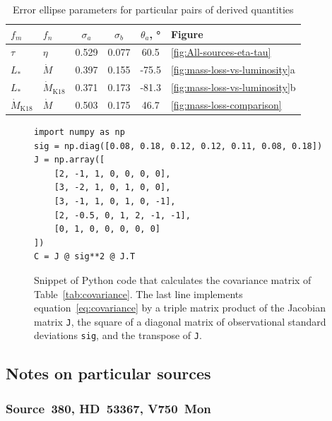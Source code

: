 \begin{table}
  \centering
  \caption[Error ellipse]{Error ellipse parameters for particular pairs of derived quantities}
  \label{tab:error-ellipse}
  \begin{tabular}{l l S S S l}
    \toprule
    \(f_m\) & \(f_n\) &  {\(\sigma_a\)} & {\(\sigma_b\)}
    & {\(\theta_a\), \si{\degree}} & Figure   \\
    \midrule
    \(\tau\) & \(\eta\) & 0.529 & 0.077 & 60.5 & \ref{fig:All-sources-eta-tau} \\
    \(L_*\) & \(\dot M\) & 0.397 & 0.155 & -75.5 & \ref{fig:mass-loss-vs-luminosity}a \\
    \(L_*\) & \(\dot M_{\text{K18}}\) & 0.371 & 0.173 & -81.3 & \ref{fig:mass-loss-vs-luminosity}b \\
    \(\dot M_{\text{K18}}\) & \(\dot M\) & 0.503 & 0.175 & 46.7 & \ref{fig:mass-loss-comparison} \\
    \bottomrule
  \end{tabular}
\end{table}


\begin{figure}
  \centering
  \footnotesize
  \begin{verbatim}
import numpy as np
sig = np.diag([0.08, 0.18, 0.12, 0.12, 0.11, 0.08, 0.18])
J = np.array([
    [2, -1, 1, 0, 0, 0, 0],
    [3, -2, 1, 0, 1, 0, 0],
    [3, -1, 1, 0, 1, 0, -1],
    [2, -0.5, 0, 1, 2, -1, -1],
    [0, 1, 0, 0, 0, 0, 0]
])
C = J @ sig**2 @ J.T
  \end{verbatim}
  \vspace*{-\baselineskip}
  \caption{Snippet of Python code that calculates the
    covariance matrix of Table~\ref{tab:covariance}.  The last line
    implements equation~\eqref{eq:covariance} by a triple matrix
    product of the Jacobian matrix \texttt{J}, the square of a
    diagonal matrix of observational standard deviations \texttt{sig},
    and the transpose of \texttt{J}.}
  \label{fig:python-covar}
\end{figure}

\subsection{Notes on particular sources}
\label{sec:notes-part-sourc}

\subsubsection{Source~380, HD~53367, V750~Mon}
\label{sec:hd-53367-v750}
  
